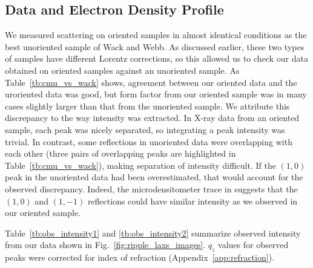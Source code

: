 \subsection{Data and Electron Density Profile}\label{sec:LAXS}
We measured scattering on oriented samples in almost identical conditions as the
best unoriented sample of Wack and Webb. As discussed earlier,
these two types of samples have different Lorentz corrections, so 
this allowed us to check our data obtained on 
oriented samples against an unoriented sample.
As Table~\ref{tb:cmu_vs_wack} shows, agreement between our oriented data
and the uroriented data was good, but form factor from our oriented
sample was in many cases slightly larger than that from the unoriented sample.
We attribute this discrepancy to the way intensity was extracted. 
In X-ray data from an oriented sample, each peak
was nicely separated, so integrating a peak intensity was trivial.
In contrast, some reflections in unoriented data were overlapping with
each other (three pairs of overlapping peaks are highlighted in 
Table~\ref{tb:cmu_vs_wack}), 
making separation of intensity difficult. If the $(1,0)$ peak in the unoriented 
data had been overestimated, that would account for the observed discrepancy.
Indeed, the microdensitometer trace in \cite{ref:Wack89} suggests that 
the $(1,0)$ and $(1,-1)$ reflections could have similar intensity as we observed
in our oriented sample. 

Table~\ref{tb:obs_intensity1} and \ref{tb:obs_intensity2} summarize observed 
intensity from our data shown in Fig.~\ref{fig:ripple_laxs_images}. $q_z$ values 
for observed peaks were corrected for index of refraction (Appendix~\ref{app:refraction}).

